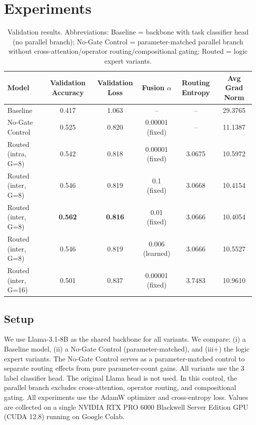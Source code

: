 \documentclass[10pt,twocolumn,letterpaper]{article}
\begin{document}
\section{Experiments}

\begin{table}[tbp]
\centering
\normalsize
{\renewcommand{\arraystretch}{1.2}
\setlength{\tabcolsep}{6pt}
\begin{tabular}{|l|c|c|c|c|c|}
\hline
Model & Validation Accuracy & Validation Loss & Fusion $\alpha$ & Routing Entropy & Avg Grad Norm \\
\hline\hline
Baseline & 0.417 & 1.063 & -- & -- & 29.3765 \\
No-Gate Control & 0.525 & 0.820 & 0.00001 (fixed) & -- & 11.1387\\
Routed (intra, G=8) & 0.542 & 0.818 &  0.00001 (fixed) & 3.0675 & 10.5972 \\
Routed (inter, G=8) & 0.546 & 0.819 & 0.1 (fixed) & 3.0668 & 10.4154 \\
Routed (inter, G=8) & \textbf{0.562} & \textbf{0.816} & 0.01 (fixed) & 3.0666 & 10.4054 \\
Routed (inter, G=8) & 0.546 & 0.819 & 0.006 (learned) & 3.0666 & 10.5527 \\
Routed (inter, G=16) & 0.501 & 0.837 & 0.00001 (fixed) & 3.7483 & 10.9610 \\
\hline
\end{tabular}
}
\caption{Validation results. Abbreviations:
Baseline = backbone with task classifier head (no parallel branch); No-Gate Control = parameter-matched parallel branch without cross-attention/operator routing/compositional gating;
Routed = logic expert variants.}
\label{tab:main_results}
\end{table}

\subsection{Setup}
We use Llama-3.1-8B \cite{grattafiori2024llama3herdmodels}
as the shared backbone for all variants.
We compare: (i) a Baseline
model, (ii) a No-Gate Control (parameter-matched), and
(iii+) the logic expert variants. The No-Gate Control serves as a
parameter-matched control to separate routing effects from pure
parameter-count gains.
All variants use the 3 label classifier head.
The original Llama head is not used.
In this control, the parallel branch excludes cross-attention, operator
routing, and compositional gating. All experiments use the AdamW
\cite{loshchilov2019decoupledweightdecayregularization}
optimizer and cross-entropy loss.
Values are collected on a single NVIDIA RTX PRO 6000 Blackwell Server
Edition GPU (CUDA 12.8) running on Google Colab.
\end{document}
